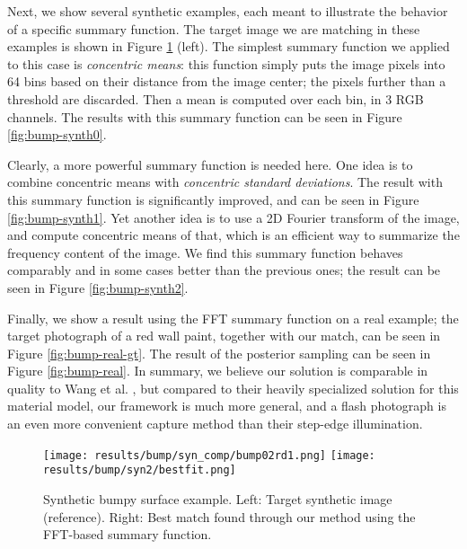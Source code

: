 Next, we show several synthetic examples, each meant to illustrate the behavior of a specific summary function. The target image we are matching in these examples is shown in Figure \ref{fig:bump-synth-gt} (left). The simplest summary function we applied to this case is \emph{concentric means}: this function simply puts the image pixels into 64 bins based on their distance from the image center; the pixels further than a threshold are discarded. Then a mean is computed over each bin, in 3 RGB channels. The results with this summary function can be seen in Figure \ref{fig:bump-synth0}.

Clearly, a more powerful summary function is needed here. One idea is to combine concentric means with \emph{concentric standard deviations}. The result with this summary function is significantly improved, and can be seen in Figure \ref{fig:bump-synth1}. Yet another idea is to use a 2D Fourier transform of the image, and compute concentric means of that, which is an efficient way to summarize the frequency content of the image. We find this summary function behaves comparably and in some cases better than the previous ones; the result can be seen in Figure \ref{fig:bump-synth2}.

Finally, we show a result using the FFT summary function on a real example; the target photograph of a red wall paint, together with our match, can be seen in Figure \ref{fig:bump-real-gt}. The result of the posterior sampling can be seen in Figure \ref{fig:bump-real}. In summary, we believe our solution is comparable in quality to Wang et al. , but compared to their heavily specialized solution for this material model, our framework is much more general, and a flash photograph is an even more convenient capture method than their step-edge illumination.


\begin{figure}[t]
	\texttt{[image: results/bump/syn\_comp/bump02rd1.png]}
	\texttt{[image: results/bump/syn2/bestfit.png]}
	\caption{Synthetic bumpy surface example. Left: Target synthetic image (reference). Right: Best match found through our method using the FFT-based summary function.}
	\label{fig:bump-synth-gt}
\end{figure}

